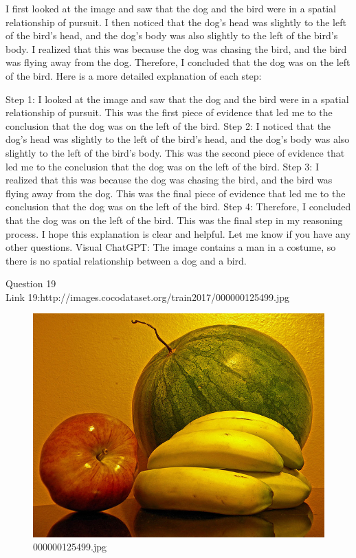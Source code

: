 \begin{enumerate}
        I first looked at the image and saw that the dog and the bird were in a spatial relationship of pursuit.
        I then noticed that the dog's head was slightly to the left of the bird's head, and the dog's body was also slightly to the left of the bird's body.
        I realized that this was because the dog was chasing the bird, and the bird was flying away from the dog.
        Therefore, I concluded that the dog was on the left of the bird.
        Here is a more detailed explanation of each step:

        Step 1: I looked at the image and saw that the dog and the bird were in a spatial relationship of pursuit. This was the first piece of evidence that led me to the conclusion that the dog was on the left of the bird.
        Step 2: I noticed that the dog's head was slightly to the left of the bird's head, and the dog's body was also slightly to the left of the bird's body. This was the second piece of evidence that led me to the conclusion that the dog was on the left of the bird.
        Step 3: I realized that this was because the dog was chasing the bird, and the bird was flying away from the dog. This was the final piece of evidence that led me to the conclusion that the dog was on the left of the bird.
        Step 4: Therefore, I concluded that the dog was on the left of the bird. This was the final step in my reasoning process.
        I hope this explanation is clear and helpful. Let me know if you have any other questions.
        \subitem Visual ChatGPT: The image contains a man in a costume, so there is no spatial relationship between a dog and a bird.
    \end{enumerate}
Question 19\\
Link 19:http://images.cocodataset.org/train2017/000000125499.jpg
    \begin{figure}[h]
        \centering
        \includegraphics[width=0.8\linewidth]{../image set/easy/000000125499.jpg}
        \caption{000000125499.jpg}
    \end{figure}
